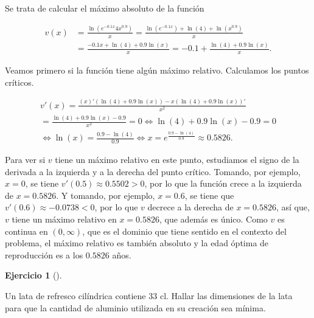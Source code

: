 \documentclass[
  spanish,
  a4paper,
]{scrreport}
\theoremstyle{definition}
\newtheorem{exercise}{Ejercicio}[chapter]
\theoremstyle{remark}
\begin{document}
\begin{tcolorbox}[enhanced jigsaw, arc=.35mm, bottomrule=.15mm, bottomtitle=1mm, breakable, colback=white, colbacktitle=quarto-callout-tip-color!10!white, colframe=quarto-callout-tip-color-frame, coltitle=black, left=2mm, leftrule=.75mm, opacityback=0, opacitybacktitle=0.6, rightrule=.15mm, title=\textcolor{quarto-callout-tip-color}{\faLightbulb}\hspace{0.5em}{Solución}, titlerule=0mm, toprule=.15mm, toptitle=1mm]

Se trata de calcular el máximo absoluto de la función

\begin{align*}
v(x) &=\frac{\ln(e^{-0.1x}4x^{0.9})}{x} = \frac{\ln(e^{-0.1x})+\ln(4)+\ln(x^{0.9})}{x}\\ 
&= \frac{-0.1x+\ln(4)+0.9\ln(x)}{x} = -0.1+\frac{\ln(4)+0.9\ln(x)}{x}.
\end{align*}

Veamos primero si la función tiene algún máximo relativo. Calculamos los
puntos críticos.

\[
\begin{gathered}
v'(x) = \frac{(x)'(\ln(4)+0.9\ln(x))-x(\ln(4)+0.9\ln(x))'}{x^2}\\ = \frac{\ln(4)+0.9\ln(x)-0.9}{x^2} = 0 \Leftrightarrow \ln(4)+0.9\ln(x)-0.9 = 0 \\ \Leftrightarrow \ln(x)=\frac{0.9-\ln(4)}{0.9} \Leftrightarrow x = e^{\frac{0.9-\ln(4)}{0.9}} \approx 0.5826.
\end{gathered}
\]

Para ver si \(v\) tiene un máximo relativo en este punto, estudiamos el
signo de la derivada a la izquierda y a la derecha del punto crítico.
Tomando, por ejemplo, \(x=0\), se tiene \(v'(0.5) \approx 0.5502 >0\),
por lo que la función crece a la izquierda de \(x=0.5826\). Y tomando,
por ejemplo, \(x=0.6\), se tiene que \(v'(0.6)\approx -0.0738<0\), por
lo que \(v\) decrece a la derecha de \(x=0.5826\), así que, \(v\) tiene
un máximo relativo en \(x=0.5826\), que además es único. Como \(v\) es
continua en \((0,\infty)\), que es el dominio que tiene sentido en el
contexto del problema, el máximo relativo es también absoluto y la edad
óptima de reproducción es a los \(0.5826\) años.

\end{tcolorbox}

\begin{exercise}[]\protect\hypertarget{exr-extremos-8}{}\label{exr-extremos-8}

Un lata de refresco cilíndrica contiene \(33\) cl. Hallar las
dimensiones de la lata para que la cantidad de aluminio utilizada en su
creación sea mínima.

\end{exercise}
\end{document}
